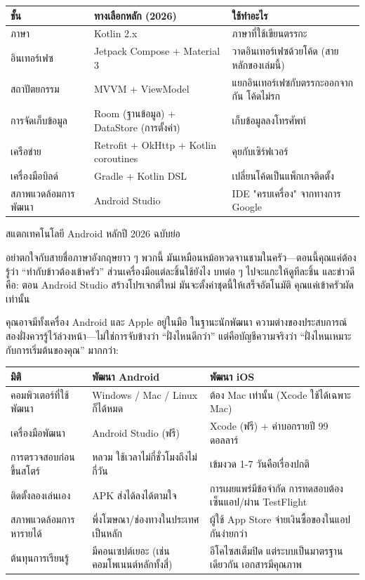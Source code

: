 \begin{center}
\begin{tabularx}{\linewidth}{|X|X|X|}
\hline
\textbf{ชั้น} & \textbf{ทางเลือกหลัก (2026)} & \textbf{ใช้ทำอะไร} \tabularnewline
\hline
ภาษา & Kotlin 2.x & ภาษาที่ใช้เขียนตรรกะ \tabularnewline
อินเทอร์เฟซ & Jetpack Compose + Material 3 & วาดอินเทอร์เฟซด้วยโค้ด (สายหลักของเล่มนี้) \tabularnewline
สถาปัตยกรรม & MVVM + ViewModel & แยกอินเทอร์เฟซกับตรรกะออกจากกัน โค้ดไม่รก \tabularnewline
การจัดเก็บข้อมูล & Room (ฐานข้อมูล) + DataStore (การตั้งค่า) & เก็บข้อมูลลงโทรศัพท์ \tabularnewline
เครือข่าย & Retrofit + OkHttp + Kotlin coroutines & คุยกับเซิร์ฟเวอร์ \tabularnewline
เครื่องมือบิลด์ & Gradle + Kotlin DSL & เปลี่ยนโค้ดเป็นแพ็กเกจติดตั้ง \tabularnewline
สภาพแวดล้อมการพัฒนา & Android Studio & IDE "ครบเครื่อง" จากทางการ Google \tabularnewline
\hline
\end{tabularx}
\end{center}

\begin{center}\small\color{gray}สแตกเทคโนโลยี Android หลักปี 2026 ฉบับย่อ\end{center}

อย่าตกใจกับสายชื่อภาษาอังกฤษยาว ๆ พวกนี้ มันเหมือนหม้อหวดจานชามในครัว—ตอนนี้คุณแค่ต้องรู้ว่า “ทำกับข้าวต้องเข้าครัว” ส่วนเครื่องมือแต่ละชิ้นใช้ยังไง บทต่อ ๆ ไปจะแกะให้ดูทีละชิ้น และข่าวดีคือ: ตอน Android Studio สร้างโปรเจกต์ใหม่ มันจะตั้งค่าชุดนี้ให้เสร็จอัตโนมัติ คุณแค่เข้าครัวผัดเท่านั้น


คุณอาจมีทั้งเครื่อง Android และ Apple อยู่ในมือ ในฐานะนักพัฒนา ความต่างของประสบการณ์สองฝั่งควรรู้ไว้ล่วงหน้า—ไม่ใช่การจับข้างว่า “ฝั่งไหนดีกว่า” แต่คือบัญชีความจริงว่า “ฝั่งไหนเหมาะกับการเริ่มต้นของคุณ” มากกว่า:

\begin{center}
\begin{tabularx}{\linewidth}{|X|X|X|}
\hline
\textbf{มิติ} & \textbf{พัฒนา Android} & \textbf{พัฒนา iOS} \tabularnewline
\hline
คอมพิวเตอร์ที่ใช้พัฒนา & Windows / Mac / Linux ก็ได้หมด & ต้อง Mac เท่านั้น (Xcode ใช้ได้เฉพาะ Mac) \tabularnewline
เครื่องมือพัฒนา & Android Studio (ฟรี) & Xcode (ฟรี) + ค่าบอกรายปี 99 ดอลลาร์ \tabularnewline
การตรวจสอบก่อนขึ้นสโตร์ & หลวม ใช้เวลาไม่กี่ชั่วโมงถึงไม่กี่วัน & เข้มงวด 1-7 วันคือเรื่องปกติ \tabularnewline
ติดตั้งลองเล่นเอง & APK ส่งได้ลงได้ตามใจ & การเผยแพร่มีข้อจำกัด การทดสอบต้องเซ็นแอป/ผ่าน TestFlight \tabularnewline
สภาพแวดล้อมการหารายได้ & พึ่งโฆษณา/ช่องทางในประเทศเป็นหลัก & ผู้ใช้ App Store จ่ายเงินซื้อของในแอปกันง่ายกว่า \tabularnewline
ต้นทุนการเรียนรู้ & มีคอนเซปต์เยอะ (เช่น คอมโพเนนต์หลักทั้งสี่) & อีโคไซสเต็มปิด แต่ระบบเป็นมาตรฐานเดียวกัน เอกสารมีคุณภาพ \tabularnewline
\hline
\end{tabularx}
\end{center}

